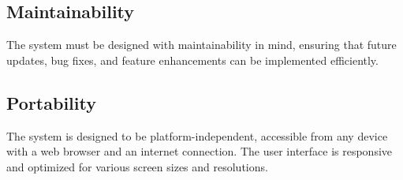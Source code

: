 \subsection{Maintainability}

The system must be designed with maintainability in mind, ensuring that future updates, bug fixes, and feature enhancements can be implemented efficiently.

\subsection{Portability}

The system is designed to be platform-independent, accessible from any device with a web browser and an internet connection. The user interface is responsive and optimized for various screen sizes and resolutions.
